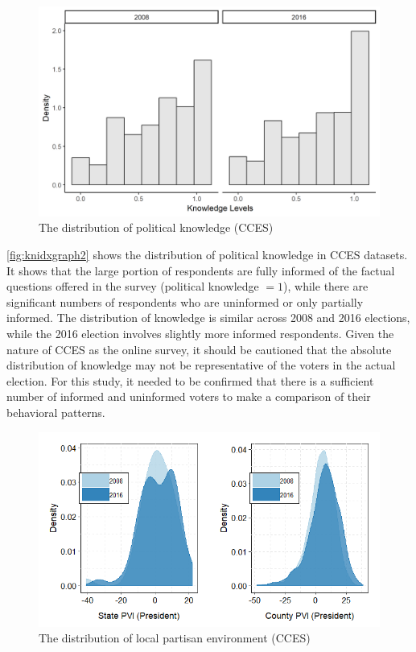 \begin{figure}[ht!!!]
    \caption{The distribution of political knowledge (CCES)}
    \label{fig:knidxgraph2}
    \includegraphics[width=\linewidth]{../outputs/cces_knowdist.png}
\end{figure}

\par \autoref{fig:knidxgraph2} shows the distribution of political knowledge in CCES datasets. It shows that the large portion of respondents are fully informed of the factual questions offered in the survey (political knowledge $= 1$), while there are significant numbers of respondents who are uninformed or only partially informed. The distribution of knowledge is similar across 2008 and 2016 elections, while the 2016 election involves slightly more informed respondents. Given the nature of CCES as the online survey, it should be cautioned that the absolute distribution of knowledge may not be representative of the voters in the actual election. For this study, it needed to be confirmed that there is a sufficient number of informed and uninformed voters to make a comparison of their behavioral patterns.

\begin{figure}[ht!!!]
    \caption{The distribution of local partisan environment (CCES)}
    \label{fig:pvigraph2}
    \includegraphics[width=\linewidth]{../outputs/cces_pvidist.png}
\end{figure}

